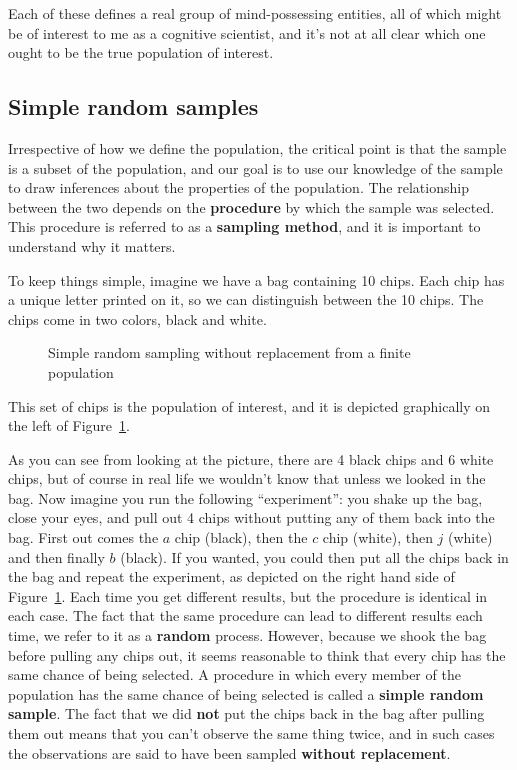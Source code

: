\documentclass[
  letterpaper,
  DIV=11,
  numbers=noendperiod]{scrreprt}
\begin{document}
Each of these defines a real group of mind-possessing entities, all of
which might be of interest to me as a cognitive scientist, and it's not
at all clear which one ought to be the true population of interest.

\subsection{Simple random samples}\label{simple-random-samples}

Irrespective of how we define the population, the critical point is that
the sample is a subset of the population, and our goal is to use our
knowledge of the sample to draw inferences about the properties of the
population. The relationship between the two depends on the
\textbf{procedure} by which the sample was selected. This procedure is
referred to as a \textbf{sampling method}, and it is important to
understand why it matters.

To keep things simple, imagine we have a bag containing 10 chips. Each
chip has a unique letter printed on it, so we can distinguish between
the 10 chips. The chips come in two colors, black and white.

\begin{figure}


\caption{\label{fig-srs1}Simple random sampling without replacement from
a finite population}

\end{figure}%

This set of chips is the population of interest, and it is depicted
graphically on the left of Figure~\ref{fig-srs1}.

As you can see from looking at the picture, there are 4 black chips and
6 white chips, but of course in real life we wouldn't know that unless
we looked in the bag. Now imagine you run the following ``experiment'':
you shake up the bag, close your eyes, and pull out 4 chips without
putting any of them back into the bag. First out comes the \(a\) chip
(black), then the \(c\) chip (white), then \(j\) (white) and then
finally \(b\) (black). If you wanted, you could then put all the chips
back in the bag and repeat the experiment, as depicted on the right hand
side of Figure~\ref{fig-srs1}. Each time you get different results, but
the procedure is identical in each case. The fact that the same
procedure can lead to different results each time, we refer to it as a
\textbf{random} process. However, because we shook the bag before
pulling any chips out, it seems reasonable to think that every chip has
the same chance of being selected. A procedure in which every member of
the population has the same chance of being selected is called a
\textbf{simple random sample}. The fact that we did \textbf{not} put the
chips back in the bag after pulling them out means that you can't
observe the same thing twice, and in such cases the observations are
said to have been sampled \textbf{without replacement}.
\end{document}
